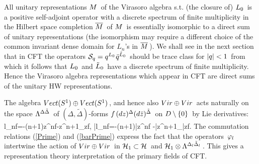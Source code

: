 All unitary representations \s$M\hspace{0.05cm}$ of the Virasoro
algebra s.\s t. (the closure of) \s$L_0\hspace{0.05cm}$ is a
positive self-adjoint operator with a discrete
spectrum of finite multiplicity in the Hilbert
space completion \s${\overline M}\hspace{0.05cm}$ of \s$M\hspace{0.05cm}$ is essentially
isomorphic to a direct sum of unitary representations
(the isomorphism may require a different choice
of the common invariant dense domain for \s$L_n$'s
in \s${\overline M}\hspace{0.05cm}$)\m. \m We shall see in the next section
that in CFT the operators \s${\cal S}_q=q^{L_0}
\hspace{0.025cm}\bar q^{\tilde L_0}\hspace{0.05cm}$ should be trace class for \s$|q|<1\hspace{0.05cm}$
from which it follows that \s$L_0\hspace{0.05cm}$ and \s$\tilde L_0\hspace{0.05cm}$
have a discrete spectrum of finite multiplicity.
Hence the Virasoro algebra representations which
appear in CFT are direct sums of the unitary HW
representations.
\vskip 0.3cm

The algebra \s$Vect(S^1)\oplus Vect(S^1)\hspace{0.05cm}$, and hence
also \s$Vir\oplus Vir\hspace{0.05cm}$ acts naturally on the space
\s$\Lambda^{\Delta\tilde\Delta}\hspace{0.05cm}$
of \s$(\Delta,\tilde\Delta)$-forms \s$f\hspace{0.05cm}(dz)^{\Delta}
(d\bar z)^{\tilde\Delta}\hspace{0.05cm}$ on \s$D\setminus\{0\}\hspace{0.05cm}$ by
Lie derivatives:
\qq
l_n\s f\s=\s-\Delta\m(n+1)\s z^n\m f\s-\s z^{n+1}\m\da_{z}f\s,
\quad\quad\bar l_n\s f\s=\s-\tilde\Delta\m(n+1)\s\bar z^n\m f\s
-\s\bar z^{n+1}\m\da_{\bar z}f\s.
\non
\qqq
The commutation relations (\ref{Prime}) and (\ref{barPrime})
express the fact that the operators $\hspace{0.05cm}\varphi_l\hspace{0.05cm}$
intertwine the action of \s$Vir\oplus Vir\hspace{0.05cm}$ in \s${\cal H}_1\subset{\cal H}\hspace{0.05cm}$
and ${\cal H}_1\otimes\Lambda^{\Delta_l\tilde\Delta_l}\hspace{0.05cm}$. This
gives a representation theory interpretation of the primary
fields of CFT.
\vs 1.1cm




\vskip 0.4cm

